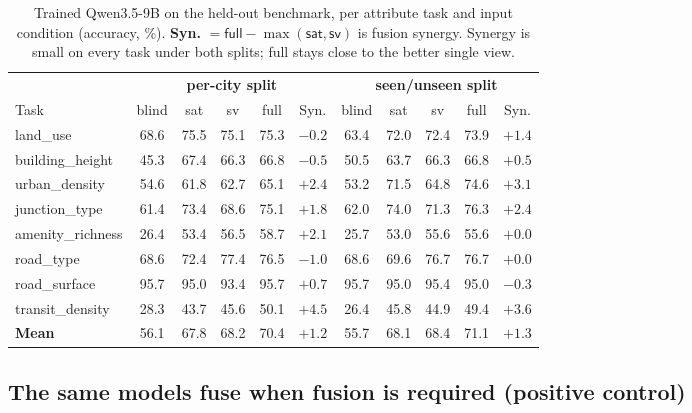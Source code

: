 \documentclass[runningheads]{llncs}
\begin{document}
\begin{table}[t]
  \centering
  \caption{Trained Qwen3.5-9B on the held-out benchmark, per attribute task and
  input condition (accuracy, \%). \textbf{Syn.} $=\textsf{full}-\max(\textsf{sat},
  \textsf{sv})$ is fusion synergy. Synergy is small on every task under both
  splits; \textsf{full} stays close to the better single view.}
  \label{tab:fusion-main}
  \setlength{\tabcolsep}{4.5pt}
  \begin{tabular}{@{}lcccc@{\;}c@{\qquad}cccc@{\;}c@{}}
    \toprule
    & \multicolumn{5}{c}{\textbf{per-city split}} & \multicolumn{5}{c}{\textbf{seen/unseen split}} \\
    \cmidrule(lr){2-6}\cmidrule(lr){7-11}
    Task & blind & sat & sv & full & Syn. & blind & sat & sv & full & Syn. \\
    \midrule
    land\_use         & 68.6 & 75.5 & 75.1 & 75.3 & $-0.2$ & 63.4 & 72.0 & 72.4 & 73.9 & $+1.4$ \\
    building\_height  & 45.3 & 67.4 & 66.3 & 66.8 & $-0.5$ & 50.5 & 63.7 & 66.3 & 66.8 & $+0.5$ \\
    urban\_density    & 54.6 & 61.8 & 62.7 & 65.1 & $+2.4$ & 53.2 & 71.5 & 64.8 & 74.6 & $+3.1$ \\
    junction\_type    & 61.4 & 73.4 & 68.6 & 75.1 & $+1.8$ & 62.0 & 74.0 & 71.3 & 76.3 & $+2.4$ \\
    amenity\_richness & 26.4 & 53.4 & 56.5 & 58.7 & $+2.1$ & 25.7 & 53.0 & 55.6 & 55.6 & $+0.0$ \\
    road\_type        & 68.6 & 72.4 & 77.4 & 76.5 & $-1.0$ & 68.6 & 69.6 & 76.7 & 76.7 & $+0.0$ \\
    road\_surface     & 95.7 & 95.0 & 93.4 & 95.7 & $+0.7$ & 95.7 & 95.0 & 95.4 & 95.0 & $-0.3$ \\
    transit\_density  & 28.3 & 43.7 & 45.6 & 50.1 & $+4.5$ & 26.4 & 45.8 & 44.9 & 49.4 & $+3.6$ \\
    \midrule
    \textbf{Mean}     & 56.1 & 67.8 & 68.2 & 70.4 & $\mathbf{+1.2}$ & 55.7 & 68.1 & 68.4 & 71.1 & $\mathbf{+1.3}$ \\
    \bottomrule
  \end{tabular}
\end{table}

\subsection{The same models fuse when fusion is required (positive control)}
\label{sec:control}
\end{document}
